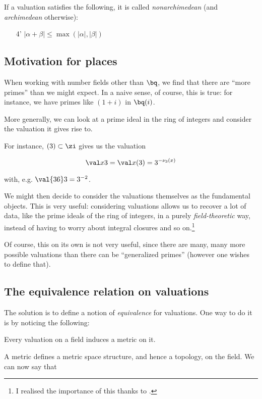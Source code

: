 If a valuation satisfies the following, it is called \textit{nonarchimedean}
(and \textit{archimedean} otherwise):

\begin{enumerate}
\item[4'] $|\alpha + \beta| \leq \max(|\alpha|,|\beta|)$
\end{enumerate}

\subsection{Motivation for places}
\label{sec:whatisaplace}
When working with number fields other than $\bq$, we find that there are ``more
primes'' than we might expect. In a naive sense, of course, this is true: for
instance, we have primes like $(1+i)$ in $\bq(i)$.

More generally, we can look at a prime ideal in the ring of integers and
consider the valuation it gives rise to.


For instance, $(3)\subset\zi$ gives us
the valuation

\[ \val x 3 = \val x {(3)} = 3^{-\nu_3(x)} \]

with, e.g. $ \val {36} 3 = 3^{-2} $.

We might then decide to consider the valuations themselves as the fundamental
objects. This is very useful: considering valuations allows us to recover a lot
of data, like the prime ideals of the ring of integers, in a purely
\textit{field-theoretic} way, instead of having to worry about integral closures
and so on.\footnote{I realised the importance of this thanks to \cite{placemse}.}

Of course, this on its own is not very useful, since there are many,
many more possible valuations than there can be ``generalized primes'' (however one
wishes to define that).

\subsection{The equivalence relation on valuations}

The solution is to define a notion of \textit{equivalence} for valuations. One
way to do it is by noticing the following:

\begin{thm}
  Every valuation on a field induces a metric on it.
\end{thm}

A metric defines a metric space structure, and hence a topology, on the field.
We can now say that

